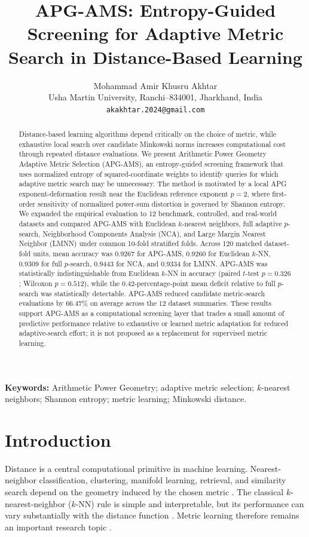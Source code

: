 \documentclass[11pt]{article}
\title{APG-AMS: Entropy-Guided Screening for Adaptive Metric Search in Distance-Based Learning}
\author{Mohammad Amir Khusru Akhtar\\Usha Martin University, Ranchi--834001, Jharkhand, India\\\texttt{akakhtar.2024@gmail.com}}
\date{}
\begin{document}
\maketitle

\begin{abstract}
Distance-based learning algorithms depend critically on the choice of metric, while exhaustive local search over candidate Minkowski norms increases computational cost through repeated distance evaluations. We present Arithmetic Power Geometry Adaptive Metric Selection (APG-AMS), an entropy-guided screening framework that uses normalized entropy of squared-coordinate weights to identify queries for which adaptive metric search may be unnecessary. The method is motivated by a local APG exponent-deformation result near the Euclidean reference exponent $p=2$, where first-order sensitivity of normalized power-sum distortion is governed by Shannon entropy. We expanded the empirical evaluation to 12 benchmark, controlled, and real-world datasets and compared APG-AMS with Euclidean $k$-nearest neighbors, full adaptive $p$-search, Neighborhood Components Analysis (NCA), and Large Margin Nearest Neighbor (LMNN) under common 10-fold stratified folds. Across 120 matched dataset-fold units, mean accuracy was 0.9267 for APG-AMS, 0.9260 for Euclidean $k$-NN, 0.9309 for full $p$-search, 0.9443 for NCA, and 0.9334 for LMNN. APG-AMS was statistically indistinguishable from Euclidean $k$-NN in accuracy (paired $t$-test $p=0.326$; Wilcoxon $p=0.512$), while the 0.42-percentage-point mean deficit relative to full $p$-search was statistically detectable. APG-AMS reduced candidate metric-search evaluations by 66.47\% on average across the 12 dataset summaries. These results support APG-AMS as a computational screening layer that trades a small amount of predictive performance relative to exhaustive or learned metric adaptation for reduced adaptive-search effort; it is not proposed as a replacement for supervised metric learning.
\end{abstract}

\noindent\textbf{Keywords:} Arithmetic Power Geometry; adaptive metric selection; $k$-nearest neighbors; Shannon entropy; metric learning; Minkowski distance.

\section{Introduction}
Distance is a central computational primitive in machine learning. Nearest-neighbor classification, clustering, manifold learning, retrieval, and similarity search depend on the geometry induced by the chosen metric \cite{cover1967,bishop2006,hastie2009,murphy2012}. The classical $k$-nearest-neighbor ($k$-NN) rule is simple and interpretable, but its performance can vary substantially with the distance function \cite{cover1967,devroye1996,cunningham2021}. Metric learning therefore remains an important research topic \cite{xing2003,goldberger2005,weinberger2009,kulis2013,bellet2013}.
\end{document}
